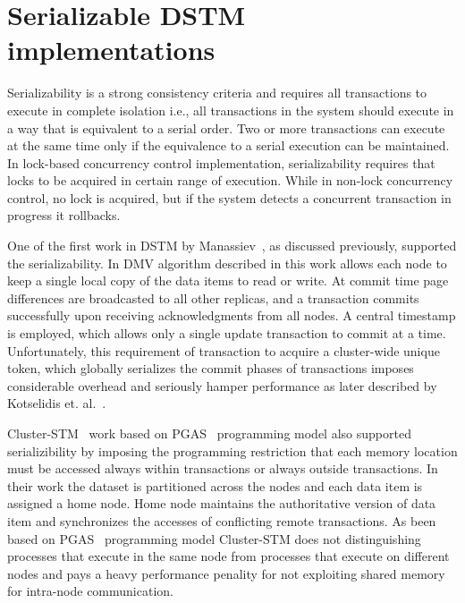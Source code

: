 \documentclass[12pt,english]{report}
\begin{document}
\section{Serializable DSTM implementations}

Serializability is a strong consistency criteria and requires all transactions to execute in  complete isolation i.e., all transactions in the system should execute in a way that is equivalent to a serial order. Two or more transactions can execute at the same time only if the equivalence to a serial execution can be maintained. In lock-based concurrency control
implementation, serializability requires that locks to be acquired in certain range of
execution. While in non-lock concurrency control, no lock is acquired, but if the system detects a concurrent transaction in progress it rollbacks.

One of the first work in DSTM by Manassiev~\cite{Manassiev:2006:EDV:1122971.1123002}, as discussed previously, supported the serializability. In DMV algorithm described in this work allows each node to keep a single local copy of the data items to read or write. At commit time page differences are broadcasted to all other replicas, and a transaction commits successfully upon receiving acknowledgments from all nodes. A central timestamp is employed, which allows only a single update transaction to commit at a time. Unfortunately, this requirement of transaction to acquire a cluster-wide unique token, which globally serializes the commit phases of transactions imposes considerable overhead and seriously hamper performance as later described by Kotselidis et. al.~\cite{Kotselidis08distm:a}.

Cluster-STM~\cite{Bocchino:2008:STM:1345206.1345242} work based on PGAS~\cite{PGAS:Programmin:Model} programming model also supported serializibility by imposing the programming restriction that each memory location must be accessed always within transactions or always outside transactions. In their work the dataset is partitioned across the nodes and each data item is assigned a home node. Home node maintains the authoritative version of data item and synchronizes the accesses of conflicting remote transactions. As been
based on PGAS~\cite{PGAS:Programmin:Model} programming model Cluster-STM does not distinguishing processes that execute in the same node from processes
that execute on different nodes and pays a heavy performance penality for not exploiting shared memory for intra-node communication.
\end{document}
